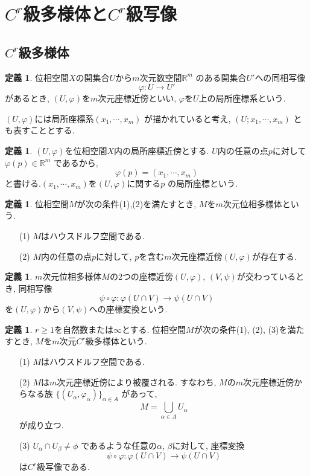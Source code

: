 \documentclass[a4j,12pt]{jarticle}
\theoremstyle{definition}
\newtheorem{definition}[theorem]{定義}
\begin{document}
\section{$C^r$級多様体と$C^r$級写像}
\subsection{$C^r$級多様体}
\begin{definition}
    位相空間$X$の開集合$U$から$m$次元数空間$\mathbb{R}^m$
    のある開集合$U'$への同相写像
    $$\varphi:U\rightarrow U'$$
    があるとき, $(U, \varphi)$を$m$次元座標近傍といい, 
    $\varphi$を$U$上の局所座標系という. 
\end{definition}
$(U,\varphi)$には局所座標系$(x_1, \cdots ,x_m)$
    が描かれていると考え, $(U;x_1, \cdots ,x_m)$
    とも表すこととする. 
\begin{definition}
    $(U, \varphi)$を位相空間$X$内の局所座標近傍とする.
    $U$内の任意の点$p$に対して$\varphi(p) \in \mathbb{R}^m$
    であるから, 
    $$\varphi(p)=(x_1, \cdots ,x_m)$$
    と書ける.$(x_1, \cdots ,x_m)$を$(U, \varphi)$に関する$p$
    の局所座標という.
\end{definition}
\begin{definition}
    位相空間$M$が次の条件(1),(2)を満たすとき, 
    $M$を$m$次元位相多様体という. 
    \begin{itemize}
        \item[(1)]$M$はハウスドルフ空間である.
        \item[(2)]$M$内の任意の点$p$に対して, 
        $p$を含む$m$次元座標近傍$(U,\varphi)$が存在する.
    \end{itemize}
\end{definition}
\begin{definition}
    $m$次元位相多様体$M$の$2$つの座標近傍$(U, \varphi)$, 
    $(V, \psi)$が交わっているとき, 同相写像
    $$\psi \circ \varphi:\varphi(U\cap V)\rightarrow \psi(U\cap V)$$
    を$(U, \varphi)$から$(V, \psi)$への座標変換という. 
\end{definition}
\begin{definition}\label{def:C^r manifold}
    $r\geq 1$を自然数または$\infty$とする. 
    位相空間$M$が次の条件(1), (2), (3)を満たすとき, 
    $M$を$m$次元$C^r$級多様体という.
    \begin{itemize}
        \item[(1)]$M$はハウスドルフ空間である.
        \item[(2)]$M$は$m$次元座標近傍により被覆される. 
        すなわち, $M$の$m$次元座標近傍からなる族
        $\{(U_\alpha, \varphi_\alpha)\}_{\alpha \in A}$
        があって, 
        $$M = \bigcup_{\alpha \in A}U_\alpha$$
        が成り立つ. 
        \item[(3)]$U_\alpha \cap U_\beta \neq \phi$
        であるような任意の$\alpha$, $\beta$に対して, 座標変換
        $$\psi \circ \varphi:\varphi(U\cap V)\rightarrow \psi(U\cap V)$$
        は$C^r$級写像である. 
    \end{itemize}
\end{definition}
\end{document}
